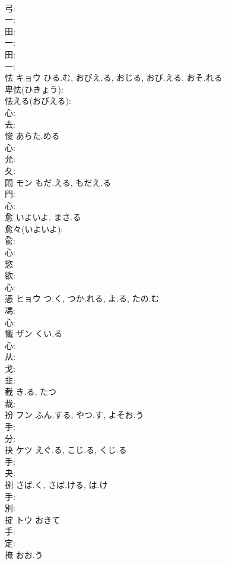 \documentclass[8pt]{extreport}
\begin{document}
\begin{CJK}{UTF8}{min}
\\	弓: 
\\	一: 
\\	田: 
\\	一: 
\\	田: 
\\	一: 
\\	怯	キョウ	ひる.む, おびえ.る, おじる, おび.える, おそ.れる		
\\	卑怯(ひきょう): 
\\	怯える(おびえる): 
\\	心: 
\\	去: 
\\	悛		あらた.める			
\\	心: 
\\	允: 
\\	夂: 
\\	悶	モン	もだ.える, もだえ.る		
\\	門: 
\\	心: 
\\	愈		いよいよ, まさ.る			
\\	愈々(いよいよ): 
\\	兪: 
\\	心: 
\\	慾					
\\	欲: 
\\	心: 
\\	憑	ヒョウ	つ.く, つか.れる, よ.る, たの.む		
\\	馮: 
\\	心: 
\\	懺	ザン	くい.る			
\\	心: 
\\	从: 
\\	戈: 
\\	韭: 
\\	截		き.る, たつ			
\\	裁: 
\\	扮	フン	ふん.する, やつ.す, よそお.う		
\\	手: 
\\	分: 
\\	抉	ケツ	えぐ.る, こじ.る, くじ.る		
\\	手: 
\\	夬: 
\\	捌		さば.く, さば.ける, は.け			
\\	手: 
\\	別: 
\\	掟	トウ	おきて		
\\	手: 
\\	定: 
\\	掩		おお.う			

\end{CJK}
\end{document}
